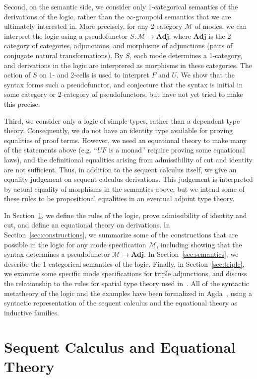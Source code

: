\documentclass{drl-common/llncs}
\newcommand{\M}{\ensuremath{\mathcal{M}}}
\newcommand{\Adj}{\textbf{Adj}}
\begin{document}
Second, on the semantic side, we consider only 1-categorical semantics
of the derivations of the logic, rather than the $\infty$-groupoid
semantics that we are ultimately interested in.  More precisely, for any
2-category \M\/ of modes, we can interpret the logic using a
pseudofunctor $S : \M \to \Adj$, where $\Adj$ is the 2-category of
categories, adjunctions, and morphisms of adjunctions (pairs of conjugate natural
transformations).  By $S$, each mode determines a 1-category, and
derivations in the logic are interprered as morphisms in these
categories.  The action of $S$ on 1- and 2-cells is used to interpret
$F$ and $U$.  We show that the syntax forms such a pseudofunctor, and
conjecture that the syntax is initial in some category or 2-category of
pseudofunctors, but have not yet tried to make this precise.

Third, we consider only a logic of simple-types, rather than a dependent
type theory.  Consequently, we do not have an identity type available
for proving equalities of proof terms.  However, we need an equational
theory to make many of the statements above (e.g. ``$UF$ is a monad''
require proving some equational laws), and the definitional equalities
arising from admissibility of cut and identity are not sufficient.
Thus, in addition to the sequent calculus itself, we give an equality
judgement on sequent calculus derivations.  This judgement is
interpreted by actual equality of morphisms in the semantics above, but
we intend some of these rules to be propositional equalities in an eventual
adjoint type theory.

In Section~\ref{sec:rules}, we define the rules of the logic, prove
admissibility of identity and cut, and define an equational theory on
derivations.  In Section~\ref{sec:constructions}, we summarize some of
the constructions that are possible in the logic for any mode
specification \M, including showing that the syntax determines a
pseudofunctor $\M \to \Adj$.  In Section~\ref{sec:semantics}, we
describe the 1-categorical semantics of the logic.  Finally, in
Section~\ref{sec:triple}, we examine some specific mode specifications
for triple adjunctions, and discuss the relationship to the rules for
spatial type theory used in~\citep{shulman15realcohesion}.  All of the
syntactic metatheory of the logic and the examples have been formalized
in Agda~\citep{norell07thesis}, using a syntactic representation of the
sequent calculus and the equational theory as inductive families.  

\section{Sequent Calculus and Equational Theory}
\label{sec:rules}
\end{document}
